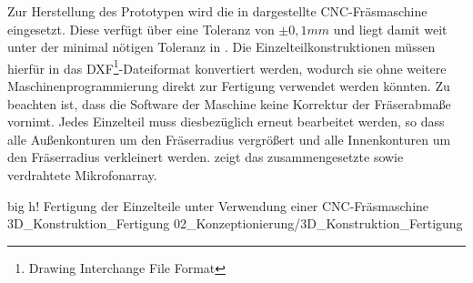 Zur Herstellung des Prototypen wird die in  dargestellte CNC-Fräsmaschine eingesetzt. Diese verfügt über eine Toleranz von $\pm 0,1 mm$ und liegt damit weit unter der minimal nötigen Toleranz in . Die Einzelteilkonstruktionen müssen hierfür in das DXF\footnote{Drawing Interchange File Format}-Dateiformat konvertiert werden, wodurch sie ohne weitere Maschinenprogrammierung direkt zur Fertigung verwendet werden könnten. Zu beachten ist, dass die Software der Maschine keine Korrektur der Fräserabmaße vornimt. Jedes Einzelteil muss diesbezüglich erneut bearbeitet werden, so dass alle Außenkonturen um den Fräserradius vergrößert und alle Innenkonturen um den Fräserradius verkleinert werden.  zeigt das zusammengesetzte sowie verdrahtete Mikrofonarray.


         {big}                 %
         {h!}             %
         {Fertigung der Einzelteile unter Verwendung einer CNC-Fräsmaschine}                %
         {3D_Konstruktion_Fertigung}                %
         {02_Konzeptionierung/3D_Konstruktion_Fertigung}     %


